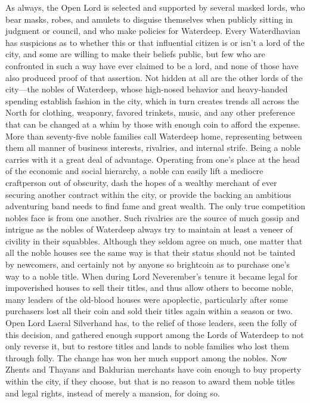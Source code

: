 \documentclass[10pt,a4paper,twoside,twocolumn,openany,bg=print,nodeprecatedcode]{dndbook}
\begin{document}
As always, the Open Lord is selected and supported by several masked lords, who bear masks, robes, and amulets to disguise themselves when publicly sitting in judgment or council, and who make policies for Waterdeep. Every Waterdhavian has suspicions as to whether this or that influential citizen is or isn't a lord of the city, and some are willing to make their beliefs public, but few who are confronted in such a way have ever claimed to be a lord, and none of those have also produced proof of that assertion.
Not hidden at all are the other lords of the city—the nobles of Waterdeep, whose high-nosed behavior and heavy-handed spending establish fashion in the city, which in turn creates trends all across the North for clothing, weaponry, favored trinkets, music, and any other preference that can be changed at a whim by those with enough coin to afford the expense. More than seventy-five noble families call Waterdeep home, representing between them all manner of business interests, rivalries, and internal strife.
Being a noble carries with it a great deal of advantage. Operating from one's place at the head of the economic and social hierarchy, a noble can easily lift a mediocre craftperson out of obscurity, dash the hopes of a wealthy merchant of ever securing another contract within the city, or provide the backing an ambitious adventuring band needs to find fame and great wealth. The only true competition nobles face is from one another. Such rivalries are the source of much gossip and intrigue as the nobles of Waterdeep always try to maintain at least a veneer of civility in their squabbles.
Although they seldom agree on much, one matter that all the noble houses see the same way is that their status should not be tainted by newcomers, and certainly not by anyone so brightcoin as to purchase one's way to a noble title. When during Lord Neverember's tenure it became legal for impoverished houses to sell their titles, and thus allow others to become noble, many leaders of the old-blood houses were apoplectic, particularly after some purchasers lost all their coin and sold their titles again within a season or two. Open Lord Laeral Silverhand has, to the relief of those leaders, seen the folly of this decision, and gathered enough support among the Lords of Waterdeep to not only reverse it, but to restore titles and lands to noble families who lost them through folly. The change has won her much support among the nobles. Now Zhents and Thayans and Baldurian merchants have coin enough to buy property within the city, if they choose, but that is no reason to award them noble titles and legal rights, instead of merely a mansion, for doing so.
\end{document}
